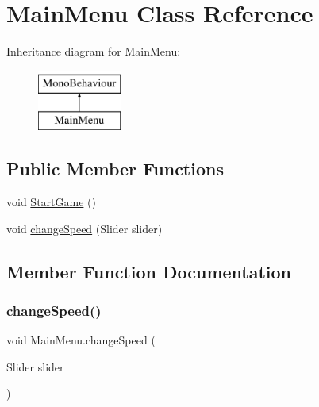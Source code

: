 \hypertarget{classMainMenu}{}\section{Main\+Menu Class Reference}
\label{classMainMenu}
Inheritance diagram for Main\+Menu\+:\begin{figure}[H]
\begin{center}
\leavevmode
\includegraphics[height=2.000000cm]{classMainMenu}
\end{center}
\end{figure}
\subsection*{Public Member Functions}
\begin{DoxyCompactItemize}
\item 
void \hyperlink{classMainMenu_ac2a74cb6e3c827e2a8db8c41141f0984}{Start\+Game} ()
\item 
void \hyperlink{classMainMenu_ae97afb8baa23badff72d1f4bc74ededd}{change\+Speed} (Slider slider)
\end{DoxyCompactItemize}


\subsection{Member Function Documentation}
\mbox{\label{classMainMenu_ae97afb8baa23badff72d1f4bc74ededd}} 
\subsubsection{\texorpdfstring{change\+Speed()}{changeSpeed()}}
{\footnotesize\ttfamily void Main\+Menu.\+change\+Speed (\begin{DoxyParamCaption}\item[{Slider}]{slider }\end{DoxyParamCaption})\hspace{0.3cm}{\ttfamily [inline]}}

\mbox{\label{classMainMenu_ac2a74cb6e3c827e2a8db8c41141f0984}} 
